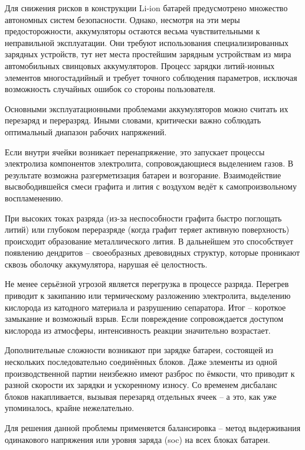Для снижения рисков в конструкции Li-ion батарей предусмотрено множество автономных систем безопасности. 
Однако, несмотря на эти меры предосторожности, аккумуляторы остаются весьма чувствительными к неправильной эксплуатации. 
Они требуют использования специализированных зарядных устройств, 
тут нет места простейшим зарядным устройствам из мира автомобильных свинцовых аккумуляторов.
Процесс зарядки литий-ионных элементов многостадийный и требует точного 
соблюдения параметров, исключая возможность случайных ошибок со стороны пользователя.

Основными эксплуатационными проблемами аккумуляторов можно считать их перезаряд и переразряд. 
Иными словами, критически важно соблюдать оптимальный диапазон рабочих напряжений.

Если внутри ячейки возникает перенапряжение, 
это запускает процессы электролиза компонентов электролита, 
сопровождающиеся выделением газов. В результате возможна разгерметизация батареи и возгорание. 
Взаимодействие высвободившейся смеси графита и лития с воздухом ведёт к самопроизвольному воспламенению.

При высоких токах разряда (из-за неспособности графита быстро поглощать литий) 
или глубоком переразряде (когда графит теряет активную поверхность) происходит образование металлического лития. 
В дальнейшем это способствует появлению дендритов – своеобразных древовидных структур, которые проникают сквозь оболочку аккумулятора, нарушая её целостность.

Не менее серьёзной угрозой является перегрузка в процессе разряда. 
Перегрев приводит к закипанию или термическому разложению электролита,
 выделению кислорода из катодного материала и разрушению сепаратора. 
 Итог – короткое замыкание и возможный взрыв. 
 Если повреждение сопровождается доступом кислорода из атмосферы, интенсивность реакции значительно возрастает.

Дополнительные сложности возникают при зарядке батареи, 
состоящей из нескольких последовательно соединённых блоков. 
Даже элементы из одной производственной партии неизбежно имеют разброс по ёмкости, 
что приводит к разной скорости их зарядки и ускоренному износу. 
Со временем дисбаланс блоков накапливается, вызывая перезаряд отдельных ячеек – а это, как уже упоминалось, крайне нежелательно.

Для решения данной проблемы применяется балансировка – метод выдерживания одинакового напряжения 
или уровня заряда (\ac{soc}) на всех блоках батареи.